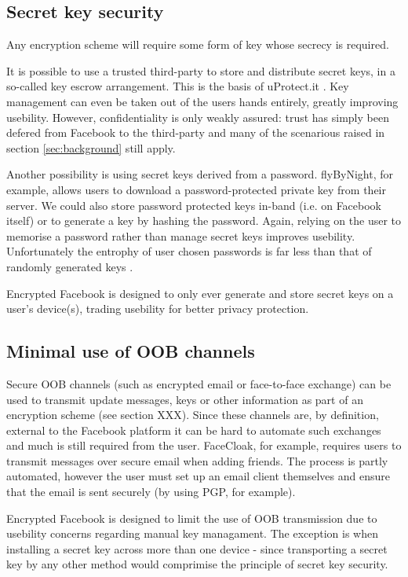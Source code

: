 \FloatBarrier
\subsection{Secret key security}

Any encryption scheme will require some form of key whose secrecy is required.

It is possible to use a trusted third-party to store and distribute secret keys, in a so-called key escrow arrangement. This is the basis of uProtect.it \cite{uprotect}. Key management can even be taken out of the users hands entirely, greatly improving usebility. However, confidentiality is only weakly assured: trust has simply been defered from Facebook to the third-party and many of the scenarious raised in section \ref{sec:background} still apply.

Another possibility is using secret keys derived from a password. flyByNight, for example, allows users to download a password-protected private key from their server. We could also store password protected keys in-band (i.e. on Facebook itself) or to generate a key by hashing the password. Again, relying on the user to memorise a password rather than manage secret keys improves usebility. Unfortunately the entrophy of user chosen passwords is far less than that of randomly generated keys \cite{password}.

Encrypted Facebook is designed to only ever generate and store secret keys on a user's device(s), trading usebility for better privacy protection.


\FloatBarrier
\subsection{Minimal use of OOB channels}

Secure \ac{OOB} channels (such as encrypted email or face-to-face exchange) can be used to transmit update messages, keys or other information as part of an encryption scheme (see section XXX). Since these channels are, by definition, external to the Facebook platform it can be hard to automate such exchanges and much is still required from the user. FaceCloak, for example, requires users to transmit messages over secure email when adding friends. The process is partly automated, however the user must set up an email client themselves and ensure that the email is sent securely (by using PGP, for example).

Encrypted Facebook is designed to limit the use of \ac{OOB} transmission due to usebility concerns regarding manual key managament. The exception is when installing a secret key across more than one device - since transporting a secret key by any other method would comprimise the principle of secret key security.


